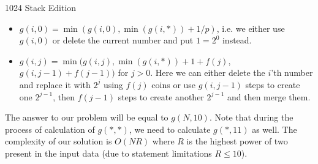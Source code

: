 \begin{problem}{1024 Stack Edition}
\begin{enumerate}
\begin{itemize}
\item $g(i, 0) = \min( g(i, 0), \min (g(i, *)) + 1 / p)$,
i.e. we either use $g(i, 0)$ or delete the current number
and put $1 = 2^0$ instead.
    
\item $g(i, j) = \min( g(i, j), \min (g(i, *)) + 1 + f(j)$,
$g(i, j - 1) + f(j - 1) )$ for $j > 0$.
Here we can either delete the $i$'th number and replace it with 
$2^j$ using $f(j)$ coins or use $g(i, j - 1)$ steps to
create one $2^{j-1}$, then $f(j-1)$ steps to create
another $2^{j-1}$ and then merge them.

\end{itemize}
\end{enumerate}

The answer to our problem will be equal to $g(N, 10)$.
Note that during the process of calculation of $g(*, *)$,
we need to calculate $g(*, 11)$ as well.
The complexity of our solution is $O(NR)$ where $R$ is the highest
power of two present in the input data
(due to statement limitations $R \le 10$).

\end{problem}
